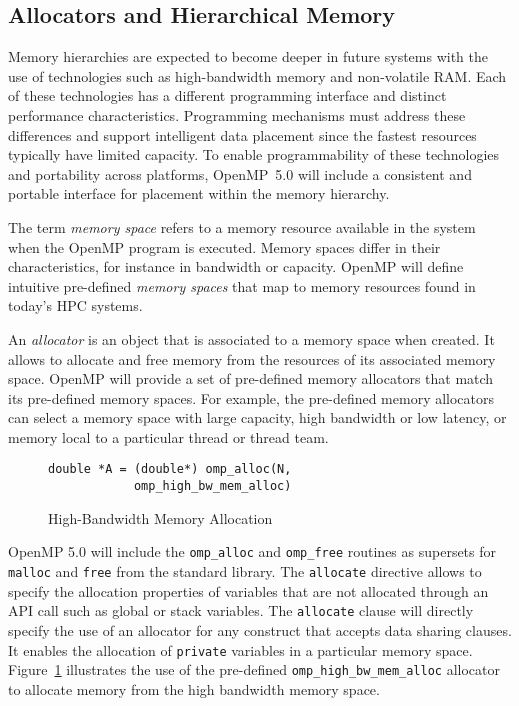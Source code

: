 \subsection{Allocators and Hierarchical Memory}
\label{sub:allocators_and_hierarchical_memory}

Memory hierarchies are expected to become deeper in future systems with the
use of technologies such as high-bandwidth memory and non-volatile RAM. Each 
of these technologies has a different programming interface and distinct
performance characteristics. Programming mechanisms must address these 
differences and support intelligent data placement since the fastest resources
typically have limited capacity. To enable programmability of these 
technologies and portability across platforms, OpenMP~5.0 will include a 
consistent and portable interface for placement within the memory hierarchy.

The term \emph{memory space} refers to a memory resource available in the
system when the OpenMP program is executed. Memory spaces differ in their characteristics, for instance in bandwidth or
capacity. OpenMP will define intuitive pre-defined \emph{memory spaces} that map to memory resources found in today's HPC systems.

An \emph{allocator} is an object that is associated to a memory space when created. It allows to allocate and free memory from the resources of its associated memory space. OpenMP will provide a set of pre-defined memory allocators that match its pre-defined memory spaces. For example, the pre-defined memory allocators can select a memory space with large capacity, high bandwidth or low latency, 
or memory local to a particular thread or thread team.


\begin{figure}
\begin{verbatim}
double *A = (double*) omp_alloc(N,
            omp_high_bw_mem_alloc)
\end{verbatim}
\caption{High-Bandwidth Memory Allocation\label{fig:allocators}}
\end{figure}

OpenMP 5.0 will include the \texttt{omp\_alloc} and \texttt{omp\_free} 
routines as supersets for \texttt{malloc} and \texttt{free} from 
the standard library. The \texttt{allocate} directive allows to specify the allocation properties of variables that are not allocated through an API call such as global or stack variables. The \texttt{allocate} clause will directly specify 
the use of an allocator for any construct that accepts data sharing clauses.
It enables the allocation of \texttt{private} variables in a particular memory
space. Figure~\ref{fig:allocators} illustrates the use of the pre-defined
\texttt{omp\_high\_bw\_mem\_alloc} allocator to allocate memory from the 
high bandwidth memory space.

